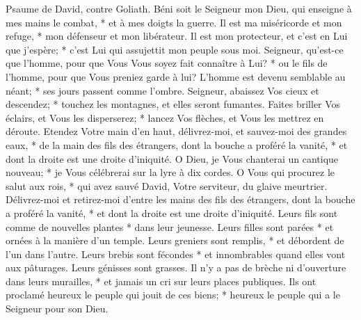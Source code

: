 Psaume de David, contre Goliath. Béni soit le Seigneur mon Dieu, qui enseigne à mes mains le combat, * et à mes doigts la guerre.
Il est ma miséricorde et mon refuge, * mon défenseur et mon libérateur. Il est mon protecteur, et c'est en Lui que j'espère; * c'est Lui qui assujettit mon peuple sous moi.
Seigneur, qu'est-ce que l'homme, pour que Vous Vous soyez fait connaître à Lui? * ou le fils de l'homme, pour que Vous preniez garde à lui?
L'homme est devenu semblable au néant; * ses jours passent comme l'ombre.
Seigneur, abaissez Vos cieux et descendez; * touchez les montagnes, et elles seront fumantes.
Faites briller Vos éclairs, et Vous les disperserez; * lancez Vos flèches, et Vous les mettrez en déroute.
Etendez Votre main d'en haut, délivrez-moi, et sauvez-moi des grandes eaux, * de la main des fils des étrangers,
dont la bouche a proféré la vanité, * et dont la droite est une droite d'iniquité.
O Dieu, je Vous chanterai un cantique nouveau; * je Vous célébrerai sur la lyre à dix cordes.
O Vous qui procurez le salut aux rois, * qui avez sauvé David, Votre serviteur, du glaive meurtrier.
Délivrez-moi et retirez-moi d'entre les mains des fils des étrangers, dont la bouche a proféré la vanité, * et dont la droite est une droite d'iniquité.
Leurs fils sont comme de nouvelles plantes * dans leur jeunesse. Leurs filles sont parées * et ornées à la manière d'un temple.
Leurs greniers sont remplis, * et débordent de l'un dans l'autre. Leurs brebis sont fécondes * et innombrables quand elles vont aux pâturages.
Leurs génisses sont grasses. Il n'y a pas de brèche ni d'ouverture dans leurs murailles, * et jamais un cri sur leurs places publiques.
Ils ont proclamé heureux le peuple qui jouit de ces biens; * heureux le peuple qui a le Seigneur pour son Dieu.

